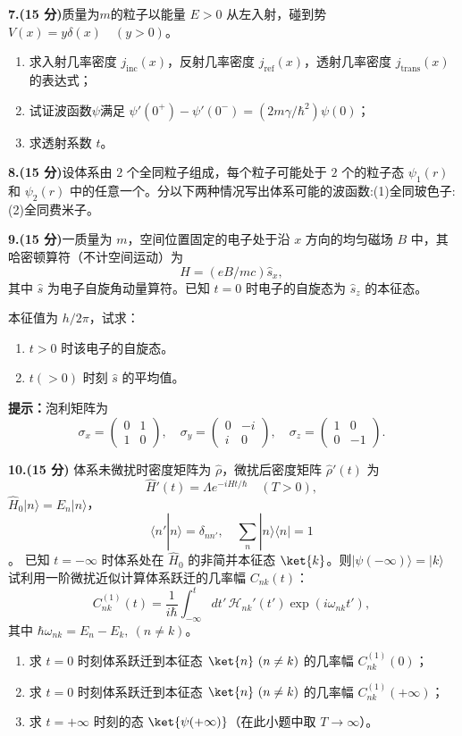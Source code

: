 \textbf{7.(15 分)}质量为$m$的粒子以能量 $E > 0$ 从左入射，碰到势 $V(x) = y\delta(x) \quad (y > 0)$。

\begin{enumerate}
    \item 求入射几率密度 $j_{\text{inc}}(x)$，反射几率密度 $j_{\text{ref}}(x)$，透射几率密度 $j_{\text{trans}}(x)$ 的表达式；
    \item 试证波函数$\psi$满足 $\psi'(0^+) - \psi'(0^-) = \left(2m\gamma/\hbar^2\right) \psi(0)$；
    \item 求透射系数 $t$。
\end{enumerate}

\textbf{8.(15 分)}设体系由 $2$ 个全同粒子组成，每个粒子可能处于 $2$ 个的粒子态 $\psi_1(r)$ 和 $\psi_2(r)$ 中的任意一个。分以下两种情况写出体系可能的波函数:(1)全同玻色子:(2)全同费米子。

\textbf{9.(15 分)}一质量为 $m$，空间位置固定的电子处于沿 $x$ 方向的均匀磁场 $B$ 中，其哈密顿算符（不计空间运动）为
$$H = \left( eB/mc \right) \hat{s}_x,~$$
其中 $\hat{s}$ 为电子自旋角动量算符。已知 $t = 0$ 时电子的自旋态为 $\hat{s}_z$ 的本征态。

本征值为 $h/2\pi$，试求：
\begin{enumerate}
    \item $t > 0$ 时该电子的自旋态。
    \item $t(> 0)$ 时刻 $\hat{s}$ 的平均值。
\end{enumerate}

\textbf{提示：}泡利矩阵为
$$\sigma_x = \begin{pmatrix} 0 & 1 \\ 1 & 0 \end{pmatrix}, \quad \sigma_y = \begin{pmatrix} 0 & -i \\ i & 0 \end{pmatrix}, \quad \sigma_z = \begin{pmatrix} 1 & 0 \\ 0 & -1 \end{pmatrix}.~$$

\textbf{10.(15 分)} 体系未微扰时密度矩阵为 $\hat{\rho}$，微扰后密度矩阵 $\hat{\rho}'(t)$ 为
$$\hat{H}'(t) = \Lambda e^{-iHt/\hbar} \quad (T > 0),~$$
$\hat{H}_0 \lvert n \rangle = E_n \lvert n \rangle$，
$$\langle n' | n \rangle = \delta_{nn'}, \quad \sum_n |n\rangle \langle n| = 1~$$。
已知 $t = -\infty$ 时体系处在 $\hat{H}_0$ 的非简并本征态 $\ket{k}$。则$\lvert \psi(-\infty) \rangle = \lvert k \rangle$  试利用一阶微扰近似计算体系跃迁的几率幅 $C_{nk}(t)$： 
$$C_{nk}^{(1)}(t) = \frac{1}{i\hbar} \int_{-\infty}^{t} dt' \, \mathcal{H}_{nk}'(t') \exp(i\omega_{nk}t'),~$$ 其中 $\hbar\omega_{nk} = E_n - E_k, \ (n \neq k)$。
\begin{enumerate}
        \item 求 $t = 0$ 时刻体系跃迁到本征态 $\ket{n} \ (n \neq k) $ 的几率幅 $C_{nk}^{(1)}(0)$；
        \item 求 $t = 0$ 时刻体系跃迁到本征态 $\ket{n} \ (n \neq k)$ 的几率幅 $C_{nk}^{(1)}(+\infty)$；
        \item 求 $t = +\infty$ 时刻的态 $ \ket{\psi(+\infty)} $（在此小题中取 $T \to \infty$）。
    \end{enumerate}